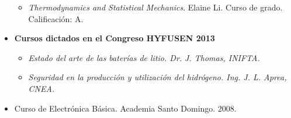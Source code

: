 \documentclass[10pt]{article}
\begin{document}
\begin{itemize}
\begin{itemize}
    \item {\it Thermodynamics and Statistical Mechanics}. Elaine Li. Curso de grado. Calificación: A.
   \end{itemize}
  \item {\bf Cursos dictados en el Congreso HYFUSEN 2013}
  \begin{itemize}
   \item {\it Estado del arte de las baterías de litio. Dr. J. Thomas, INIFTA.}
   \item {\it Seguridad en la producción y utilización del hidrógeno. Ing. J. L. Aprea, CNEA.}
  \end{itemize} 
  \item {Curso de Electrónica Básica}. Academia Santo Domingo. 2008.
 \end{itemize}
\end{document}
